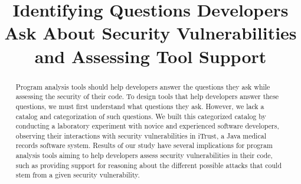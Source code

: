\documentclass[conference]{IEEEtran}
\begin{document}
%

\title{Identifying Questions Developers Ask About Security Vulnerabilities and Assessing Tool Support}

\author{
\and
{}
}

\maketitle

\begin{abstract}

Program analysis tools should help developers answer the questions they ask while assessing the security of their code. 
To design tools that help developers answer these questions, we must first understand what questions they ask.
However, we lack a catalog and categorization of such questions. 
We built this categorized catalog by conducting a laboratory experiment with novice and experienced software developers, observing their interactions with security vulnerabilities in iTrust, a Java medical records software system.
Results of our study have several implications for program analysis tools aiming to help developers assess security vulnerabilities in their code, such as providing support for reasoning about the different possible attacks that could stem from a given security vulnerability.



\end{abstract}

%
\IEEEpeerreviewmaketitle
\end{document}

